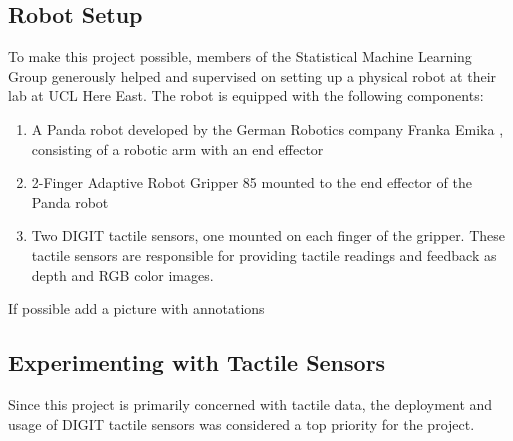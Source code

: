 \documentclass[a4paper]{report}
\theoremstyle{definition}
\begin{document}
\subsection{Robot Setup}
To make this project possible, members of the Statistical Machine Learning Group generously helped and supervised on setting up a physical robot at their lab at UCL Here East. The robot is equipped with the following components:
\begin{enumerate}
    \item A Panda robot developed by the German Robotics company Franka Emika \cite{franka}, consisting of a robotic arm with an end effector
    \item 2-Finger Adaptive Robot Gripper 85 \cite{robotiq} mounted to the end effector of the Panda robot
    \item Two DIGIT \cite{digit} tactile sensors, one mounted on each finger of the gripper. These tactile sensors are responsible for providing tactile readings and feedback as depth and RGB color images.
\end{enumerate}
{\color{red}If possible add a picture with annotations}

\subsection{Experimenting with Tactile Sensors}
\label{sec:1.3.1}
Since this project is primarily concerned with tactile data, the deployment and usage of DIGIT \cite{digit} tactile sensors was considered a top priority for the project.\\
\end{document}
